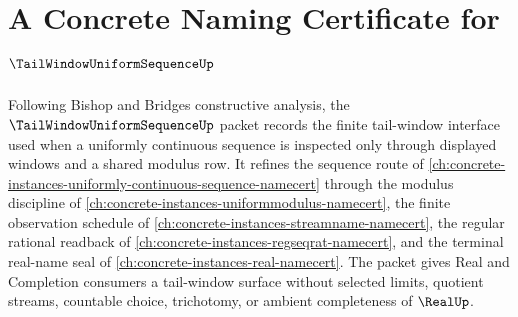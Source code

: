 \chapter{A Concrete Naming Certificate for $\TailWindowUniformSequenceUp$}
\label{ch:concrete-instances-tail-window-uniform-sequence-namecert}

Following Bishop and Bridges constructive analysis, the $\TailWindowUniformSequenceUp$ packet records the finite tail-window interface used when a uniformly continuous sequence is inspected only through displayed windows and a shared modulus row. It refines the sequence route of \autoref{ch:concrete-instances-uniformly-continuous-sequence-namecert} through the modulus discipline of \autoref{ch:concrete-instances-uniformmodulus-namecert}, the finite observation schedule of \autoref{ch:concrete-instances-streamname-namecert}, the regular rational readback of \autoref{ch:concrete-instances-regseqrat-namecert}, and the terminal real-name seal of \autoref{ch:concrete-instances-real-namecert}. The packet gives Real and Completion consumers a tail-window surface without selected limits, quotient streams, countable choice, trichotomy, or ambient completeness of $\RealUp$.

